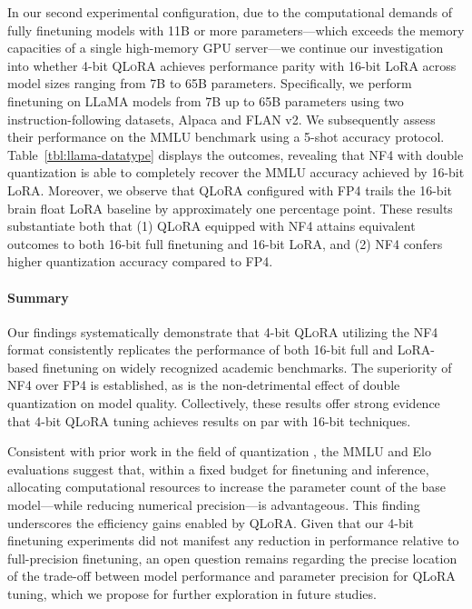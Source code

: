In our second experimental configuration, due to the computational demands of fully finetuning models with 11B or more parameters—which exceeds the memory capacities of a single high-memory GPU server—we continue our investigation into whether 4-bit \textsc{QLoRA} achieves performance parity with 16-bit LoRA across model sizes ranging from 7B to 65B parameters. Specifically, we perform finetuning on LLaMA models from 7B up to 65B parameters using two instruction-following datasets, Alpaca and FLAN v2. We subsequently assess their performance on the MMLU benchmark using a 5-shot accuracy protocol. Table~\ref{tbl:llama-datatype} displays the outcomes, revealing that NF4 with double quantization is able to completely recover the MMLU accuracy achieved by 16-bit LoRA. Moreover, we observe that \textsc{QLoRA} configured with FP4 trails the 16-bit brain float LoRA baseline by approximately one percentage point. These results substantiate both that (1) \textsc{QLoRA} equipped with NF4 attains equivalent outcomes to both 16-bit full finetuning and 16-bit LoRA, and (2) NF4 confers higher quantization accuracy compared to FP4.

\paragraph{Summary} Our findings systematically demonstrate that 4-bit \textsc{QLoRA} utilizing the NF4 format consistently replicates the performance of both 16-bit full and LoRA-based finetuning on widely recognized academic benchmarks. The superiority of NF4 over FP4 is established, as is the non-detrimental effect of double quantization on model quality. Collectively, these results offer strong evidence that 4-bit \textsc{QLoRA} tuning achieves results on par with 16-bit techniques.

Consistent with prior work in the field of quantization \citep{dettmers2022case}, the MMLU and Elo evaluations suggest that, within a fixed budget for finetuning and inference, allocating computational resources to increase the parameter count of the base model—while reducing numerical precision—is advantageous. This finding underscores the efficiency gains enabled by \textsc{QLoRA}. Given that our 4-bit finetuning experiments did not manifest any reduction in performance relative to full-precision finetuning, an open question remains regarding the precise location of the trade-off between model performance and parameter precision for QLoRA tuning, which we propose for further exploration in future studies.

